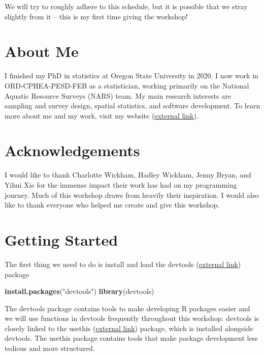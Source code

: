\documentclass[
]{book}
\newenvironment{Shaded}{\begin{snugshade}}{\end{snugshade}}
\newcommand{\KeywordTok}[1]{\textcolor[rgb]{0.13,0.29,0.53}{\textbf{#1}}}
\newcommand{\NormalTok}[1]{#1}
\newcommand{\StringTok}[1]{\textcolor[rgb]{0.31,0.60,0.02}{#1}}
\begin{document}
We will try to roughly adhere to this schedule, but it is possible that we stray slightly from it -- this is my first time giving the workshop!

\hypertarget{about-me}{%
\section*{About Me}\label{about-me}}

I finished my PhD in statistics at Oregon State University in 2020. I now work in ORD-CPHEA-PESD-FEB as a statistician, working primarily on the National Aquatic Resource Surveys (NARS) team. My main research interests are sampling and survey design, spatial statistics, and software development. To learn more about me and my work, visit my website (\href{https://michaeldumelle.github.io/}{external link}).

\hypertarget{acknowledgements}{%
\section*{Acknowledgements}\label{acknowledgements}}

I would like to thank Charlotte Wickham, Hadley Wickham, Jenny Bryan, and Yihui Xie for the immense impact their work has had on my programming journey. Much of this workshop draws from heavily their inspiration. I would also like to thank everyone who helped me create and give this workshop.

\hypertarget{getting-started}{%
\section*{Getting Started}\label{getting-started}}

The first thing we need to do is install and load the devtools (\href{https://devtools.r-lib.org/}{external link}) package

\begin{Shaded}
\begin{Highlighting}[]
\KeywordTok{install.packages}\NormalTok{(}\StringTok{"devtools"}\NormalTok{)}
\KeywordTok{library}\NormalTok{(devtools)}
\end{Highlighting}
\end{Shaded}

The devtools package contains tools to make developing R packages easier and we will use functions in devtools frequently throughout this workshop. devtools is closely linked to the usethis (\href{https://usethis.r-lib.org/}{external link}) package, which is installed alongside devtools. The usethis package contains tools that make package development less tedious and more structured.
\end{document}
